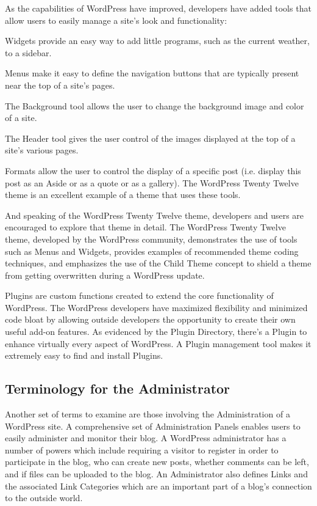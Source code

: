 As the capabilities of WordPress have improved, developers have added tools that allow users to easily manage a site's look and functionality:
\begin{compactitem}
\item Widgets provide an easy way to add little programs, such as the current weather, to a sidebar.
\item Menus make it easy to define the navigation buttons that are typically present near the top of a site's pages.
\item The Background tool allows the user to change the background image and color of a site.
\item The Header tool gives the user control of the images displayed at the top of a site's various pages.
\item Formats allow the user to control the display of a specific post (i.e. display this post as an Aside or as a quote or as a gallery). The WordPress Twenty Twelve theme is an excellent example of a theme that uses these tools.
\end{compactitem}

And speaking of the WordPress Twenty Twelve theme, developers and users are encouraged to explore that theme in detail. The WordPress Twenty Twelve theme, developed by the WordPress community, demonstrates the use of tools such as Menus and Widgets, provides examples of recommended theme coding techniques, and emphasizes the use of the Child Theme concept to shield a theme from getting overwritten during a WordPress update.

Plugins are custom functions created to extend the core functionality of WordPress. The WordPress developers have maximized flexibility and minimized code bloat by allowing outside developers the opportunity to create their own useful add-on features. As evidenced by the Plugin Directory, there's a Plugin to enhance virtually every aspect of WordPress. A Plugin management tool makes it extremely easy to find and install Plugins.

\subsection{Terminology for the Administrator}

Another set of terms to examine are those involving the Administration of a WordPress site. A comprehensive set of Administration Panels enables users to easily administer and monitor their blog. A WordPress administrator has a number of powers which include requiring a visitor to register in order to participate in the blog, who can create new posts, whether comments can be left, and if files can be uploaded to the blog. An Administrator also defines Links and the associated Link Categories which are an important part of a blog's connection to the outside world.

